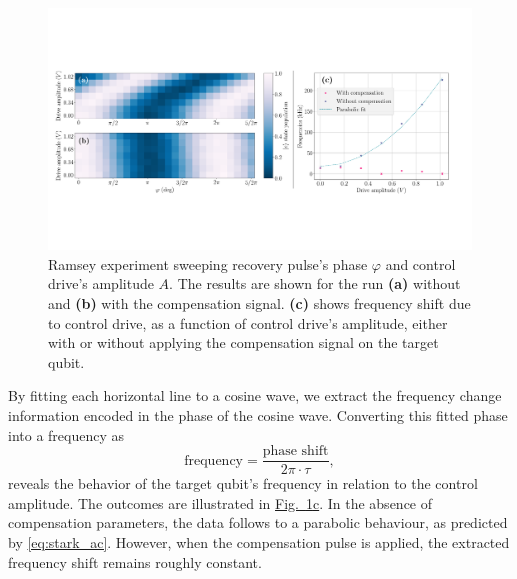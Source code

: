 \begin{figure}
    \centering
    \includegraphics[width=1\linewidth]{Images/Chap2.0/Ramsey_cancellatoin.pdf}
    \vspace{-0.5cm}
    \caption{Ramsey experiment sweeping recovery pulse's phase $\varphi$ and control drive's amplitude $A$. The results are shown for the run \textbf{(a)} without and \textbf{(b)} with the compensation signal. \textbf{(c)}  shows frequency shift due to control drive, as a function of control drive's amplitude, either with or without applying the compensation signal on the target qubit.}
    \label{fig:Ramsey_cancellation}
\end{figure}

By fitting each horizontal line to a cosine wave, we extract the frequency change information encoded in the phase of the cosine wave.
Converting this fitted phase into a frequency as
\begin{equation}
\label{eq:get_frequency}
    \text{frequency} = \frac{\text{phase shift}}{2 \pi \cdot \tau} ,
\end{equation}
reveals the behavior of the target qubit's frequency in relation to the control amplitude.
The outcomes are illustrated in \hyperref[fig:Ramsey_cancellation]{Fig.~\ref{fig:Ramsey_cancellation}c}.
In the absence of compensation parameters, the data follows to a parabolic behaviour, as predicted by \cref{eq:stark_ac}.
However, when the compensation pulse is applied, the extracted frequency shift remains roughly constant.

